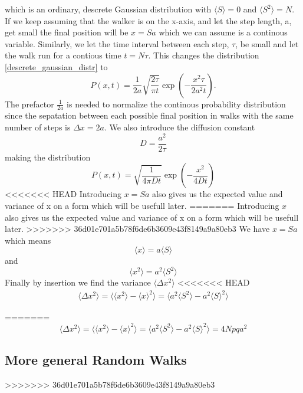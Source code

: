 which is an ordinary, descrete Gaussian distribution with $\langle S\rangle = 0$  and $\langle S^2\rangle = N$. 
If we keep assuming that the walker is on the x-axis, and let the step length, a, get small the final position will be $x=Sa$ which we can assume is a continous variable. 
Similarly, we let the time interval between each step, $\tau$, be small and let the walk run for a contious time $t=N\tau$. This changes the distribution \ref{descrete_gaussian_distr} to
\begin{equation}
 P(x,t) = \frac{1}{2a}\sqrt{\frac{2\tau}{\pi t}}\exp\left(-\frac{x^2\tau}{2a^2t}\right). 
\end{equation}
The prefactor $\frac{1}{2a}$ is needed to normalize the continous probability distribution since the sepatation between each possible final position in walks with the same number of steps is $\Delta x=2a$. 
We also introduce the diffusion constant
\begin{equation}
D = \frac{a^2}{2\tau} 
\end{equation}
making the distribution
\begin{equation}
 P(x,t) = \sqrt{\frac{1}{4\pi Dt}}\exp\left(-\frac{x^2}{4Dt}\right)
\end{equation}
<<<<<<< HEAD
Introducing $x=Sa$ also gives us the expected value and variance of x on a form which will be usefull later. 
=======
Introducing $x$ also gives us the expected value and variance of x on a form which will be usefull later. 
>>>>>>> 36d01e701a5b78f6de6b3609e43f8149a9a80eb3
We have $x=Sa$ which means 
$$\langle x\rangle=a\langle S\rangle$$ 
and 
$$\langle x^2\rangle=a^2\langle S^2\rangle$$
Finally by insertion we find the variance $\langle \Delta x^2\rangle$
<<<<<<< HEAD
\begin{align}
 \langle \Delta x^2\rangle = \langle\langle x^2\rangle -\langle x\rangle^2\rangle = \langle a^2\langle S^2\rangle -a^2\langle S\rangle^2\rangle
\end{align}

=======
\begin{equation}\label{random_walk_variance}
 \langle \Delta x^2\rangle = \langle\langle x^2\rangle -\langle x\rangle^2\rangle = \langle a^2\langle S^2\rangle -a^2\langle S\rangle^2\rangle = 4Npqa^2
\end{equation}


\subsection{More general Random Walks}\label{more_general_random_walks}
>>>>>>> 36d01e701a5b78f6de6b3609e43f8149a9a80eb3


